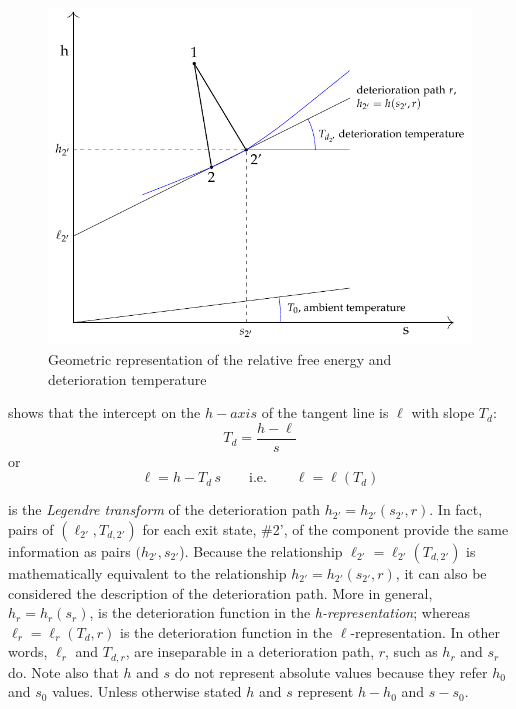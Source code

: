 \documentclass[energies,article,submit,moreauthors,pdftex]{Definitions/mdpi}
\begin{document}
\begin{figure}[ht]
	\centering
	\includegraphics[scale=0.78]{rfe.pdf}
	\caption{Geometric representation of the relative free energy and deterioration temperature}
	\label{fig:rfe}
\end{figure}

 shows that the intercept on the $h-axis$ of the tangent line is $\ell$ with slope $T_d$:
\[
T_d=\frac{h-\ell}{s}
\]
or
\begin{equation}
\ell=h-T_d\,s \qquad \text{i.e.} \qquad \ell=\ell(T_d)
\label{eq:lgdr}
\end{equation}

 is the \emph{Legendre transform} of the deterioration path $h_{2'}=h_{2'}(s_{2'},r)$. In fact, pairs of $(\ell_{2'} , T_{d,2'})$ for each exit state, \#2', of the component provide the same information as pairs $(h_{2'},s_{2'}$). Because the relationship  $\ell_{2'} = \ell_{2'}(T_{d,2'})$ is mathematically equivalent to the relationship $h_{2'} = h_{2'} (s_{2'}, r)$, it can also be considered the description of the deterioration path. More in general, $h_r=h_r (s_r)$, is the deterioration function in the \emph{h-representation}; whereas $\ell_r = \ell_r(T_d,r)$ is the deterioration function in the $\ell$-representation. In other words, $\ell_r$ and $T_{d,r}$, are inseparable in a deterioration path, $r$, such as $h_r$ and $s_r$ do. Note also that $h$ and $s$ do not represent absolute values because they refer $h_0$ and $s_0$ values. Unless otherwise stated $h$ and $s$ represent $h-h_0$ and $s-s_0$.
\end{document}
